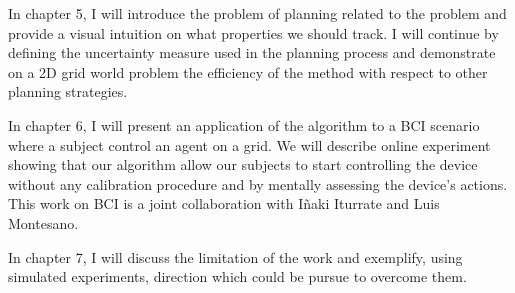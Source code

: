In chapter 5, I will introduce the problem of planning related to the problem and provide a visual intuition on what properties we should track. I will continue by defining the uncertainty measure used in the planning process and demonstrate on a 2D grid world problem the efficiency of the method with respect to other planning strategies.

In chapter 6, I will present an application of the algorithm to a BCI scenario where a subject control an agent on a grid. We will describe online experiment showing that our algorithm allow our subjects to start controlling the device without any calibration procedure and by mentally assessing the device's actions. This work on BCI is a joint collaboration with I{\~n}aki Iturrate and Luis Montesano.

In chapter 7, I will discuss the limitation of the work and exemplify, using simulated experiments, direction which could be pursue to overcome them.

